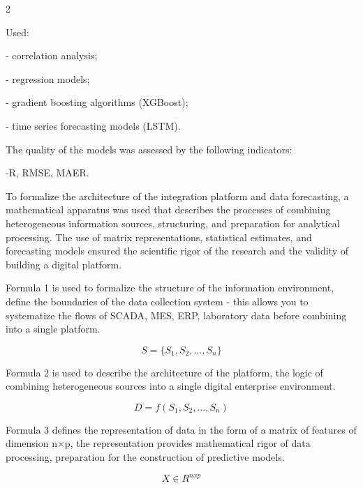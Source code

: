 \begin{figs}
\end{figs}

\begin{multicols}{2}

Used:

- correlation analysis;

- regression models;

- gradient boosting algorithms (XGBoost);

- time series forecasting models (LSTM).

The quality of the models was assessed by the following indicators:

-R, RMSE, MAER.

To formalize the architecture of the integration platform and data
forecasting, a mathematical apparatus was used that describes the
processes of combining heterogeneous information sources, structuring,
and preparation for analytical processing. The use of matrix
representations, statistical estimates, and forecasting models ensured
the scientific rigor of the research and the validity of building a
digital platform.

Formula 1 is used to formalize the structure of the information
environment, define the boundaries of the data collection system - this
allows you to systematize the flows of SCADA, MES, ERP, laboratory data
before combining into a single platform.

\begin{equation}
S = \{ S_1,S_2,\ldots,S_n\}
\end{equation}

Formula 2 is used to describe the architecture of the platform, the
logic of combining heterogeneous sources into a single digital
enterprise environment.

\begin{equation}
D = f(S_1,S_2,\ldots,S_n)
\end{equation}

Formula 3 defines the representation of data in the form of a matrix of
features of dimension n×p, the representation provides mathematical
rigor of data processing, preparation for the construction of predictive
models.

\begin{equation}
X \in R^{nxp}
\end{equation}


\end{multicols}
